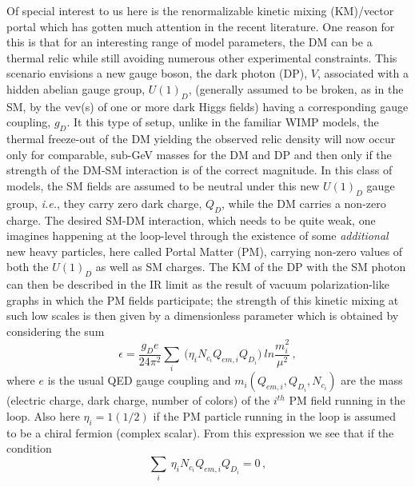 \documentclass[14pt]{article}
\def\ie{{\it i.e.}}
\begin{document}
Of special interest to us here is the renormalizable kinetic mixing (KM)/vector portal\cite{KM,vectorportal,Gherghetta:2019coi} which has gotten much attention in the recent literature. One reason 
for this is that for an interesting range of model parameters, the DM can be a thermal relic\cite{Steigman:2015hda,Saikawa:2020swg} while still avoiding numerous other experimental constraints. 
This scenario envisions a new gauge boson, the dark photon (DP)\cite{Fabbrichesi:2020wbt,Graham:2021ggy}, $V$, associated with a hidden abelian gauge group, $U(1)_D$, (generally assumed to 
be broken, as in the SM, by the vev(s) of one or more dark 
Higgs fields) having a corresponding gauge coupling, $g_D$. It this type of setup, unlike in the familiar WIMP models, the thermal freeze-out of the DM yielding 
the observed relic density will now occur only for comparable, sub-GeV masses for the DM and DP and then only if the strength of the DM-SM interaction is of the correct magnitude. 
In this class of models, the SM fields are assumed to be neutral under this new $U(1)_D$ gauge group, \ie, they carry zero dark charge, $Q_D$, while the DM carries a non-zero charge. The 
desired SM-DM interaction, which needs to be quite weak, one imagines happening at the loop-level through the existence of some {\it additional} new heavy particles, here called Portal Matter (PM)\cite{Rizzo:2018vlb,Rueter:2019wdf,Kim:2019oyh,Rueter:2020qhf,Wojcik:2020wgm,Rizzo:2021lob,Rizzo:2022qan,Wojcik:2022rtk,Rizzo:2022jti,Rizzo:2022lpm,Wojcik:2022woa,Carvunis:2022yur,Verma:2022nyd,Rizzo:2023qbj,Wojcik:2023ggt,Rizzo:2023kvy}, carrying non-zero values of both the $U(1)_D$ as well as SM charges. The KM of the DP with the SM photon can then be described 
in the IR limit as the result of vacuum polarization-like graphs in which the PM fields participate; the strength of this kinetic mixing at such low scales is then given by a dimensionless parameter 
which is obtained by considering the sum
%
\begin{equation}
\epsilon =\frac{g_D  e}{24\pi^2} \sum_i ~\big(\eta_i   N_{c_i}Q_{em,i}Q_{D_i}\big)~ ln \frac{m^2_i}{\mu^2}\,,
\end{equation}
%
where $e$ is the usual QED gauge coupling and $m_i(Q_{em,i},Q_{D_i}, N_{c_i})$ are the mass (electric charge, dark charge, number of colors) of the $i^{th}$ PM field running in the loop.
Also here $\eta_i=1(1/2)$ if the PM particle running in the loop is assumed to be a chiral fermion (complex scalar). From this expression we see that if the condition 
%
\begin{equation}
\sum_i ~\eta_i   N_{c_i}Q_{em,i}Q_{D_i}=0\,,
\end{equation}
\end{document}
